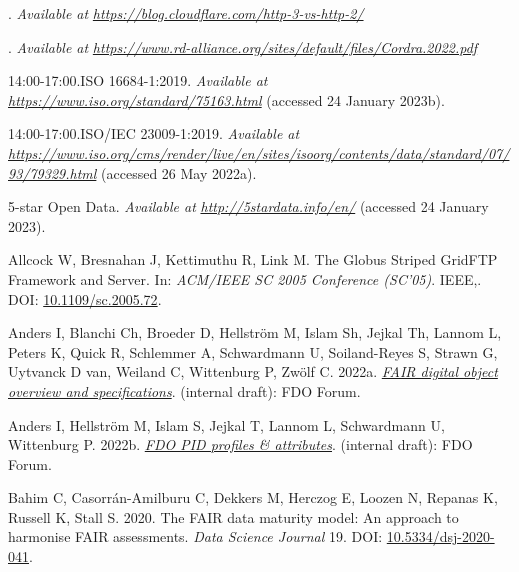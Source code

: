 \hypertarget{refs}{}
\begin{CSLReferences}{1}{0}
\leavevmode{}%
. \emph{Available at} \href{https://blog.cloudflare.com/http-3-vs-http-2/}{\emph{https://blog.cloudflare.com/http-3-vs-http-2/}}

\leavevmode{}%
. \emph{Available at} \href{https://www.rd-alliance.org/sites/default/files/Cordra.2022.pdf}{\emph{https://www.rd-alliance.org/sites/default/files/Cordra.2022.pdf}}

\leavevmode{}%
14:00-17:00.ISO 16684-1:2019. \emph{Available at} \href{https://www.iso.org/standard/75163.html}{\emph{https://www.iso.org/standard/75163.html}} (accessed 24 January 2023b).

\leavevmode{}%
14:00-17:00.ISO/IEC 23009-1:2019. \emph{Available at} \href{https://www.iso.org/cms/render/live/en/sites/isoorg/contents/data/standard/07/93/79329.html}{\emph{https://www.iso.org/cms/render/live/en/sites/isoorg/contents/data/standard/07/93/79329.html}} (accessed 26 May 2022a).

\leavevmode{}%
5-star Open Data. \emph{Available at} \href{http://5stardata.info/en/}{\emph{http://5stardata.info/en/}} (accessed 24 January 2023).

\leavevmode{}%
Allcock W, Bresnahan J, Kettimuthu R, Link M. The Globus Striped GridFTP Framework and Server. In: \emph{ACM/IEEE SC 2005 Conference (SC'05)}. IEEE,. DOI: \href{https://doi.org/10.1109/sc.2005.72}{10.1109/sc.2005.72}.

\leavevmode{}%
Anders I, Blanchi Ch, Broeder D, Hellström M, Islam Sh, Jejkal Th, Lannom L, Peters K, Quick R, Schlemmer A, Schwardmann U, Soiland-Reyes S, Strawn G, Uytvanck D van, Weiland C, Wittenburg P, Zwölf C. 2022a. \emph{\href{https://docs.google.com/document/d/1GAj-1owAAPDF7hVis2dYPPCOHiPHrIXIo4j-S5AdEFI/edit}{FAIR digital object overview and specifications}}. (internal draft): FDO Forum.

\leavevmode{}%
Anders I, Hellström M, Islam S, Jejkal T, Lannom L, Schwardmann U, Wittenburg P. 2022b. \emph{\href{https://docs.google.com/document/d/1c2mZziq5pIPmLxMHLcYqlWrjYsc2ezGMXvp0E46iljo/edit}{FDO PID profiles \& attributes}}. (internal draft): FDO Forum.

\leavevmode{}%
Bahim C, Casorrán-Amilburu C, Dekkers M, Herczog E, Loozen N, Repanas K, Russell K, Stall S. 2020. The FAIR data maturity model: An approach to harmonise FAIR assessments. \emph{Data Science Journal} 19. DOI: \href{https://doi.org/10.5334/dsj-2020-041}{10.5334/dsj-2020-041}.


\end{CSLReferences}
